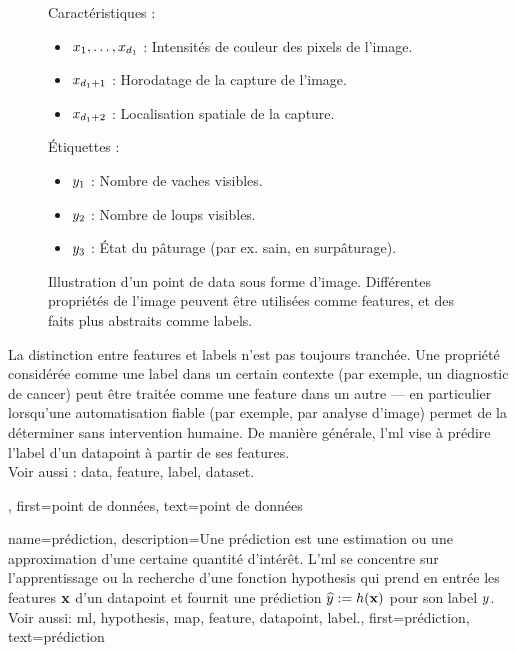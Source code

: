 {{\begin{figure}[htbp]
\begin{minipage}[t]{0.95\textwidth}
			\end{minipage}
			\begin{minipage}[t]{0.95\textwidth}
				Caractéristiques :
				\begin{itemize}
					\item $x_{1},\ldots,x_{d_{1}}$ : Intensités de couleur des pixels de l’image.
					\item $x_{d_{1}+1}$ : Horodatage de la capture de l’image.
					\item $x_{d_{1}+2}$ : Localisation spatiale de la capture.
				\end{itemize}
				Étiquettes :
				\begin{itemize}
					\item $y_{1}$ : Nombre de vaches visibles.
					\item $y_{2}$ : Nombre de loups visibles.
					\item $y_{3}$ : État du pâturage (par ex. sain, en surpâturage).
				\end{itemize}
			\end{minipage}
			\caption{Illustration d’un point de \gls{data} sous forme d’image. Différentes propriétés de l’image 
				peuvent être utilisées comme \glspl{feature}, et des faits plus abstraits comme \glspl{label}. 
				\label{fig:datapoint_cowherd_dict}}
		\end{figure}
		La distinction entre \glspl{feature} et \glspl{label} n’est pas toujours tranchée.
		Une propriété considérée comme une \gls{label} dans un certain contexte (par exemple, un diagnostic de cancer)
		peut être traitée comme une \gls{feature} dans un autre — en particulier lorsqu’une automatisation fiable (par exemple,
		par analyse d’image) permet de la déterminer sans intervention humaine.
		De manière générale, l’\gls{ml} vise à prédire l'\gls{label} d’un \gls{datapoint} à partir de ses \glspl{feature}.
		\\
		Voir aussi : \gls{data}, \gls{feature}, \gls{label}, \gls{dataset}.},
	first={point de données},
	text={point de données}  
}

{name={prédiction},
	description={Une prédiction est une estimation ou une approximation d’une certaine quantité d’intérêt.  
		L'\gls{ml} se concentre sur l’apprentissage ou la recherche d’une fonction \gls{hypothesis}  
		qui prend en entrée les \glspl{feature} ${\bf x}$ d’un \gls{datapoint} et fournit une prédiction  
		$\widehat{y} := h({\bf x})$ pour son \gls{label} $y$.
		\\ 
		Voir aussi: \gls{ml}, \gls{hypothesis}, \gls{map}, \gls{feature}, \gls{datapoint}, \gls{label}.},
	first={prédiction}, text={prédiction}
}

